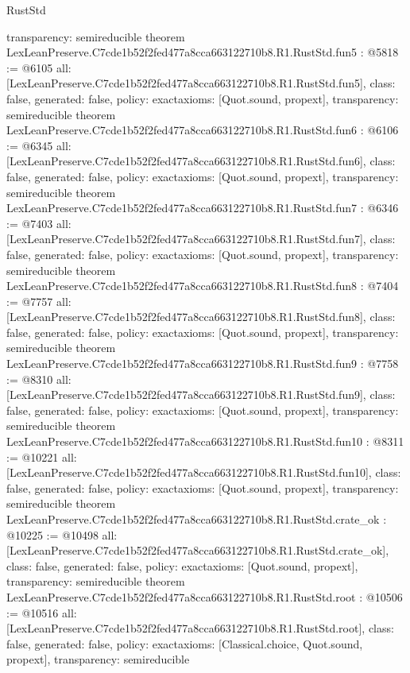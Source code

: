 \begin{lexlean}{RustStd}
\begin{coremodule}
{  transparency: semireducible
}
theorem LexLeanPreserve.C7cde1b52f2fed477a8cca663122710b8.R1.RustStd.fun5 : @5818 := @6105 {
  all: [LexLeanPreserve.C7cde1b52f2fed477a8cca663122710b8.R1.RustStd.fun5],
  class: false,
  generated: false,
  policy: exact{axioms: [Quot.sound, propext]},
  transparency: semireducible
}
theorem LexLeanPreserve.C7cde1b52f2fed477a8cca663122710b8.R1.RustStd.fun6 : @6106 := @6345 {
  all: [LexLeanPreserve.C7cde1b52f2fed477a8cca663122710b8.R1.RustStd.fun6],
  class: false,
  generated: false,
  policy: exact{axioms: [Quot.sound, propext]},
  transparency: semireducible
}
theorem LexLeanPreserve.C7cde1b52f2fed477a8cca663122710b8.R1.RustStd.fun7 : @6346 := @7403 {
  all: [LexLeanPreserve.C7cde1b52f2fed477a8cca663122710b8.R1.RustStd.fun7],
  class: false,
  generated: false,
  policy: exact{axioms: [Quot.sound, propext]},
  transparency: semireducible
}
theorem LexLeanPreserve.C7cde1b52f2fed477a8cca663122710b8.R1.RustStd.fun8 : @7404 := @7757 {
  all: [LexLeanPreserve.C7cde1b52f2fed477a8cca663122710b8.R1.RustStd.fun8],
  class: false,
  generated: false,
  policy: exact{axioms: [Quot.sound, propext]},
  transparency: semireducible
}
theorem LexLeanPreserve.C7cde1b52f2fed477a8cca663122710b8.R1.RustStd.fun9 : @7758 := @8310 {
  all: [LexLeanPreserve.C7cde1b52f2fed477a8cca663122710b8.R1.RustStd.fun9],
  class: false,
  generated: false,
  policy: exact{axioms: [Quot.sound, propext]},
  transparency: semireducible
}
theorem LexLeanPreserve.C7cde1b52f2fed477a8cca663122710b8.R1.RustStd.fun10 : @8311 := @10221 {
  all: [LexLeanPreserve.C7cde1b52f2fed477a8cca663122710b8.R1.RustStd.fun10],
  class: false,
  generated: false,
  policy: exact{axioms: [Quot.sound, propext]},
  transparency: semireducible
}
theorem LexLeanPreserve.C7cde1b52f2fed477a8cca663122710b8.R1.RustStd.crate_ok : @10225 := @10498 {
  all: [LexLeanPreserve.C7cde1b52f2fed477a8cca663122710b8.R1.RustStd.crate_ok],
  class: false,
  generated: false,
  policy: exact{axioms: [Quot.sound, propext]},
  transparency: semireducible
}
theorem LexLeanPreserve.C7cde1b52f2fed477a8cca663122710b8.R1.RustStd.root : @10506 := @10516 {
  all: [LexLeanPreserve.C7cde1b52f2fed477a8cca663122710b8.R1.RustStd.root],
  class: false,
  generated: false,
  policy: exact{axioms: [Classical.choice, Quot.sound, propext]},
  transparency: semireducible
}


\end{coremodule}
\end{lexlean}
